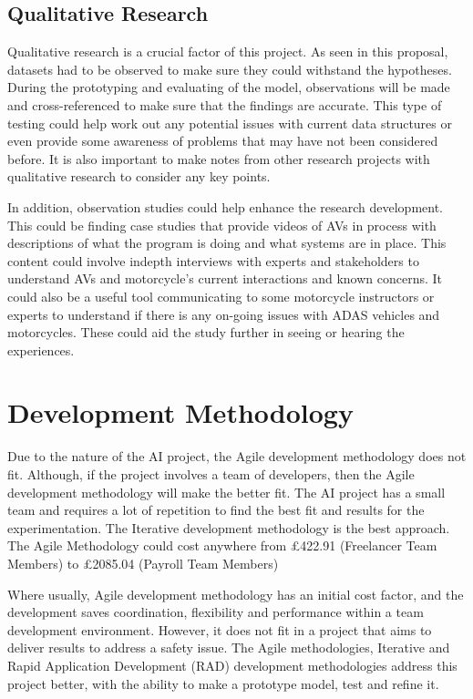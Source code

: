 \documentclass[12pt]{report} %
\begin{document}
	\section{Qualitative Research}
		Qualitative research is a crucial factor of this project. As seen in this proposal, datasets had to be observed to make sure they could withstand the hypotheses. During the prototyping and evaluating of the model, observations will be made and cross-referenced to make sure that the findings are accurate. This type of testing could help work out any potential issues with current data structures or even provide some awareness of problems that may have not been considered before. It is also important to make notes from other research projects with qualitative research to consider any key points.

		In addition, observation studies could help enhance the research development. This could be finding case studies that provide videos of AVs in process with descriptions of what the program is doing and what systems are in place. This content could involve indepth interviews with experts and stakeholders to understand AVs and motorcycle's current interactions and known concerns. It could also be a useful tool communicating to some motorcycle instructors or experts to understand if there is any on-going issues with ADAS vehicles and motorcycles. These could aid the study further in seeing or hearing the experiences.

\chapter{Development Methodology}
\label{chap:developmentMethodology}
	Due to the nature of the AI project, the Agile development methodology does not fit. Although, if the project involves a team of developers, then the Agile development methodology will make the better fit. The AI project has a small team and requires a lot of repetition to find the best fit and results for the experimentation. The Iterative development methodology is the best approach. The Agile Methodology could cost anywhere from £422.91 (Freelancer Team Members) to £2085.04 (Payroll Team Members)~\cite{owais_effort_2016} 
	
	Where usually, Agile development methodology has an initial cost factor, and the development saves coordination, flexibility and performance within a team development environment. However, it does not fit in a project that aims to deliver results to address a safety issue. The Agile methodologies, Iterative and Rapid Application Development (RAD) development methodologies address this project better, with the ability to make a prototype model, test and refine it. 
\end{document}
